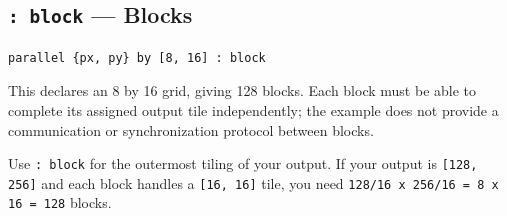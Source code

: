 \subsection*{\texttt{: block} --- Blocks}

\begin{lstlisting}[language=croqtile,caption={: block --- Blocks}]
parallel {px, py} by [8, 16] : block
\end{lstlisting}

This declares an 8 by 16 grid, giving 128 blocks. Each block must be able to complete its assigned output tile independently; the example does not provide a communication or synchronization protocol between blocks.

Use \texttt{: block} for the outermost tiling of your output. If your output is \texttt{[128, 256]} and each block handles a \texttt{[16, 16]} tile, you need \texttt{128/\allowbreak{}16 x 256/\allowbreak{}16 = 8 x 16 = 128} blocks.
